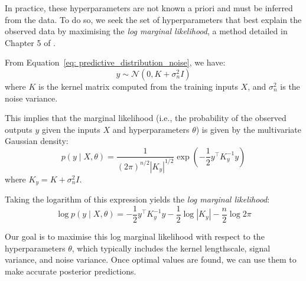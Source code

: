 \documentclass{article}
\begin{document}
\noindent
In practice, these hyperparameters are not known a priori and must be inferred from the data. To do so, we seek the set of hyperparameters that best explain the observed data by maximising the \textit{log marginal likelihood}, a method detailed in Chapter 5 of \cite{bible}.

\bigskip
\noindent
From Equation~\ref{eq:  predictive_distribution_noise}, we have:
\[
y \sim \mathcal{N}(0, K + \sigma_n^2 I)
\]
where \( K \) is the kernel matrix computed from the training inputs \( X \), and \( \sigma_n^2 \) is the noise variance.

\noindent
This implies that the marginal likelihood (i.e., the probability of the observed outputs \( y \) given the inputs \( X \) and hyperparameters \( \theta \)) is given by the multivariate Gaussian density:
\[
p(y \mid X, \theta) = \frac{1}{(2\pi)^{n/2} |K_y|^{1/2}} \exp\left( -\frac{1}{2} y^\top K_y^{-1} y \right)
\]
where \( K_y = K + \sigma_n^2 I \).

\bigskip

\noindent
Taking the logarithm of this expression yields the \textit{log marginal likelihood}:
\begin{equation}\label{eq: 5}
\log p(y \mid X, \theta) = -\frac{1}{2} y^\top K_y^{-1} y - \frac{1}{2} \log |K_y| - \frac{n}{2} \log 2\pi
\end{equation}

\noindent
Our goal is to maximise this log marginal likelihood with respect to the hyperparameters \( \theta \), which typically includes the kernel lengthscale, signal variance, and noise variance. Once optimal values are found, we can use them to make accurate posterior predictions.
\end{document}
